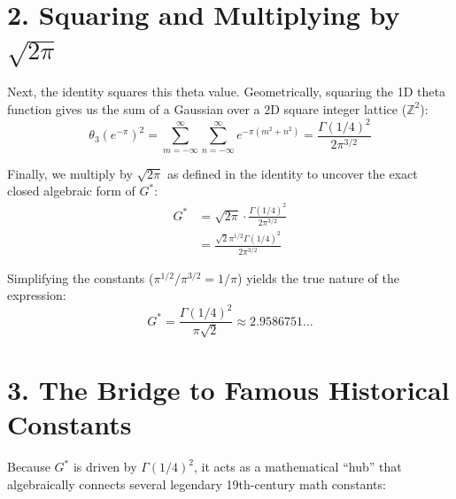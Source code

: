 \documentclass[12pt]{article}
\begin{document}
\section*{2. Squaring and Multiplying by $\sqrt{2\pi}$}
Next, the identity squares this theta value. Geometrically, squaring the 1D theta function gives us the sum of a Gaussian over a 2D square integer lattice ($\mathbb{Z}^2$):
\begin{equation}
    \theta_3(e^{-\pi})^2 = \sum_{m=-\infty}^\infty \sum_{n=-\infty}^\infty e^{-\pi(m^2+n^2)} = \frac{\Gamma(1/4)^2}{2\pi^{3/2}}
\end{equation}

Finally, we multiply by $\sqrt{2\pi}$ as defined in the identity to uncover the exact closed algebraic form of $G^*$:
\begin{align}
    G^* &= \sqrt{2\pi} \cdot \frac{\Gamma(1/4)^2}{2\pi^{3/2}} \\
        &= \frac{\sqrt{2}\pi^{1/2} \Gamma(1/4)^2}{2\pi^{3/2}}
\end{align}

Simplifying the constants ($\pi^{1/2} / \pi^{3/2} = 1/\pi$) yields the true nature of the expression:
\begin{equation}
    \boxed{ G^* = \frac{\Gamma(1/4)^2}{\pi\sqrt{2}} \approx 2.9586751\dots }
\end{equation}

\section*{3. The Bridge to Famous Historical Constants}
Because $G^*$ is driven by $\Gamma(1/4)^2$, it acts as a mathematical ``hub'' that algebraically connects several legendary 19th-century math constants:
\end{document}
